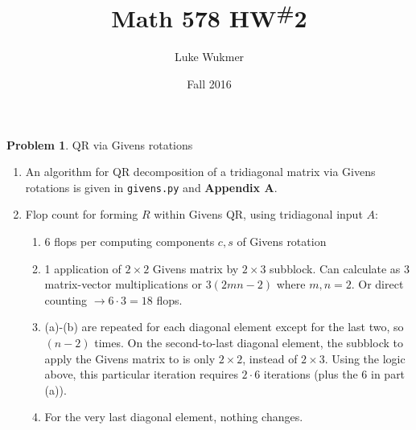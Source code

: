 \documentclass[12pt]{article}
\theoremstyle{definition}
\newtheorem{prob}{Problem}
\begin{document}
\title{Math 578 HW\textsuperscript{\#}2}
\author{Luke Wukmer}
\date{Fall 2016}
\maketitle \thispagestyle{empty} %



\begin{prob} QR via Givens rotations

    \begin{enumerate}[\bfseries(a)]
        \item
            An algorithm for QR decomposition of a tridiagonal matrix via Givens rotations is given in
            \texttt{givens.py} and \textbf{Appendix A}.
        \item
            Flop count for forming $R$ within Givens QR, using tridiagonal input $A$:
            \begin{enumerate}
                \item 6 flops per computing components $c,s$ of Givens rotation
                \item 1 application of $2\times2$ Givens matrix by $2\times3$ subblock.
                    Can calculate as 3 matrix-vector multiplications or $3(2mn-2)$ where $m,n=2$.
                    Or direct counting $\rightarrow 6\cdot3 = 18$ flops.
                \item (a)-(b) are repeated for each diagonal element except for the last two,
                    so $(n-2)$ times. On the second-to-last diagonal element,
                    the subblock to apply the Givens matrix to is only $2\times2$, instead of $2\times3$.
                    Using the logic above, this particular iteration requires $2\cdot6$ iterations
                    (plus the 6 in part (a)).
                \item
                    For the very last diagonal element, nothing changes.
            \end{enumerate}


\end{enumerate}
\end{prob}
\end{document}
